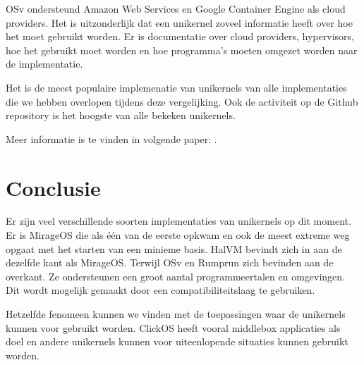 OSv ondersteund Amazon Web Services en Google Container Engine als cloud providers. Het is uitzonderlijk dat een unikernel zoveel informatie heeft over hoe het moet gebruikt worden. Er is documentatie over cloud providers, hypervisors, hoe het gebruikt moet worden en hoe programma's moeten omgezet worden naar de implementatie.

Het is de meest populaire implemenatie van unikernels van alle implementaties die we hebben overlopen tijdens deze vergelijking. Ook de activiteit op de Github repository is het hoogste van alle bekeken unikernels.

Meer informatie is te vinden in volgende paper: \cite{kivity_osvoptimizing_2014}.

\section{Conclusie}

Er zijn veel verschillende soorten implementaties van unikernels op dit moment. Er is MirageOS die als één van de eerste opkwam en ook de meest extreme weg opgaat met het starten van een minieme basis. HalVM bevindt zich in aan de dezelfde kant als MirageOS. Terwijl OSv en Rumprun zich bevinden aan de overkant. Ze ondersteunen een groot aantal programmeertalen en omgevingen. Dit wordt mogelijk gemaakt door een compatibiliteitslaag te gebruiken. 

Hetzelfde fenomeen kunnen we vinden met de toepassingen waar de unikernels kunnen voor gebruikt worden. ClickOS heeft vooral middlebox applicaties als doel en andere unikernels kunnen voor uiteenlopende situaties kunnen gebruikt worden.